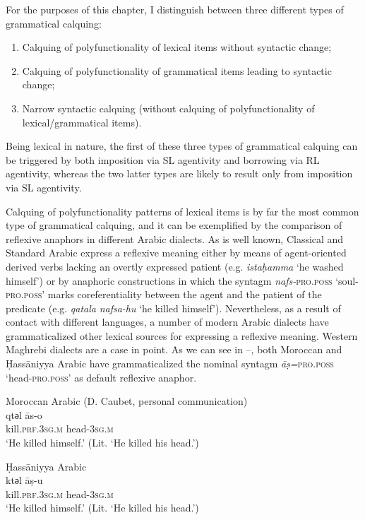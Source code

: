 \documentclass[output=paper]{langsci/langscibook}
\begin{document}
For the purposes of this chapter, I distinguish between three different types of grammatical calquing: 

\begin{enumerate} 
\item Calquing of polyfunctionality of lexical items without syntactic change;
\item Calquing of polyfunctionality of grammatical items leading to syntactic change; 
\item Narrow syntactic calquing (without calquing of polyfunctionality of lexical/grammatical items).
\end{enumerate}

Being lexical in nature, the first of these three types of grammatical calquing can be triggered by both imposition via SL agentivity and borrowing via RL agentivity, whereas the two latter types are likely to result only from imposition via SL agentivity. 

Calquing of polyfunctionality patterns of lexical items is by far the most common type of grammatical calquing, and it can be exemplified by the comparison of reflexive anaphors in different Arabic dialects. As is well known, Classical and Standard Arabic express a reflexive meaning either by means of agent-oriented derived verbs lacking an overtly expressed patient (e.g. \textit{istaḥamma} ‘he washed himself’) or by anaphoric constructions in which the syntagm \textit{nafs-}\textsc{pro.poss} ‘soul-\textsc{pro.poss’} marks coreferentiality between the agent and the patient of the predicate (e.g. \textit{qatala} \textit{nafsa-hu} ‘he killed himself’). Nevertheless, as a result of contact with different languages, a number of modern Arabic dialects have grammaticalized other lexical sources for expressing a reflexive meaning. Western Maghrebi dialects are a case in point. As we can see in --, both Moroccan and Ḥassāniyya Arabic have grammaticalized the nominal syntagm \textit{{\R}āṣ=}\textsc{pro.poss} ‘head-\textsc{pro.poss’} as default reflexive anaphor.

\ea\label{15}
{Moroccan Arabic (D. Caubet, personal communication)} \\
\gll   qtәl {\R}ās-o\\
       kill.\textsc{prf.3sg.m} head-\textsc{3sg.m}\\
\glt   `He killed himself.' (Lit. ‘He killed his head.’)
\z

\ea\label{16}
{Ḥassāniyya Arabic \citep[16]{Taine-Cheikh2008chapter}}\\
\gll   ktәl {\R}āṣ-u\\
       kill.\textsc{prf.3sg.m} head-\textsc{3sg.m}\\
\glt   `He killed himself.' (Lit. ‘He killed his head.’)
\z
\end{document}
